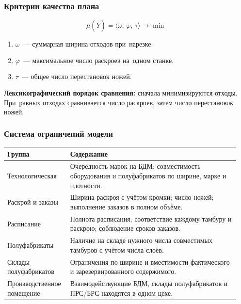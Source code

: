 \begin{frame}
    \frametitle{Критерии качества плана}
    \large
    \[
    \mu(\overline{\overline{Y}})
    =\langle\omega,\,\varphi,\,\tau\rangle\to\min
    \]
    \begin{enumerate}
        \item $\omega$~--- суммарная ширина отходов при~нарезке.
        \item $\varphi$~--- максимальное число раскроев на~одном станке.
        \item $\tau$~--- общее число перестановок ножей.
    \end{enumerate}
    \vspace{0.3cm}
    \textbf{Лексикографический порядок сравнения:}
    сначала минимизируются отходы. При~равных отходах сравнивается число раскроев, затем число перестановок ножей.
\end{frame}





\begin{frame}
    \frametitle{Система ограничений модели}
    \small
    \centering
    \begin{tabular}{|p{0.25\linewidth}|p{0.70\linewidth}|}
        \hline
        \textbf{Группа} & \textbf{Содержание} \\
        \hline
        Технологическая
        & Очерёдность марок на БДМ; совместимость оборудования и полуфабрикатов по ширине, марке и плотности. \\
        \hline
        Раскрой и заказы
        & Ширина раскроя с учётом кромки; число ножей; выполнение заказов в полном объёме. \\
        \hline
        Расписание
        & Полнота расписания; соответствие каждому тамбуру и раскрою; соблюдение сроков заказов. \\
        \hline
        Полуфабрикаты
        & Наличие на складе нужного числа совместимых тамбуров с учётом числа слоёв. \\
        \hline
        Склады полуфабрикатов
        & Ограничения по ширине и вместимости фактического и зарезервированного содержимого. \\
        \hline
        Производственное помещение
        & Взаимодействующие БДМ, склады полуфабрикатов и ПРС/БРС находятся в одном цехе. \\
        \hline
    \end{tabular}
\end{frame}



